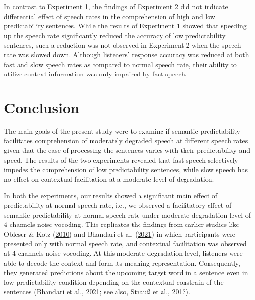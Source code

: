 \documentclass[a4paper, nobind]{templates/ociamthesis}
\begin{document}
In contrast to Experiment 1, the findings of Experiment 2 did not indicate differential effect of speech rates in the comprehension of high and low predictability sentences.
While the results of Experiment 1 showed that speeding up the speech rate significantly reduced the accuracy of low predictability sentences, such a reduction was not observed in Experiment 2 when the speech rate was slowed down.
Although listeners' response accuracy was reduced at both fast and slow speech rates as compared to normal speech rate, their ability to utilize context information was only impaired by fast speech.

\hypertarget{conclusion-2}{%
\section{Conclusion}\label{conclusion-2}}

The main goals of the present study were to examine if semantic predictability facilitates comprehension of moderately degraded speech at different speech rates given that the ease of processing the sentences varies with their predictability and speed.
The results of the two experiments revealed that fast speech selectively impedes the comprehension of low predictability sentences, while slow speech has no effect on contextual facilitation at a moderate level of degradation.

In both the experiments, our results showed a significant main effect of predictability at normal speech rate,
i.e., we observed a facilitatory effect of semantic predictability at normal speech rate under moderate degradation level of 4 channels noise vocoding.
This replicates the findings from earlier studies like Obleser \& Kotz (\protect\hyperlink{ref-Obleser2010}{2010}) and Bhandari et al. (\protect\hyperlink{ref-Bhandari2021}{2021}) in which participants were presented only with normal speech rate, and contextual facilitation was observed at 4 channels noise vocoding.
At this moderate degradation level, listeners were able to decode the context and form its meaning representation.
Consequently, they generated predictions about the upcoming target word in a sentence even in low predictability condition depending on the contextual constrain of the sentences (\protect\hyperlink{ref-Bhandari2021}{Bhandari et al., 2021}; see also, \protect\hyperlink{ref-Strauss2013}{Strauß et al., 2013}).
\end{document}

